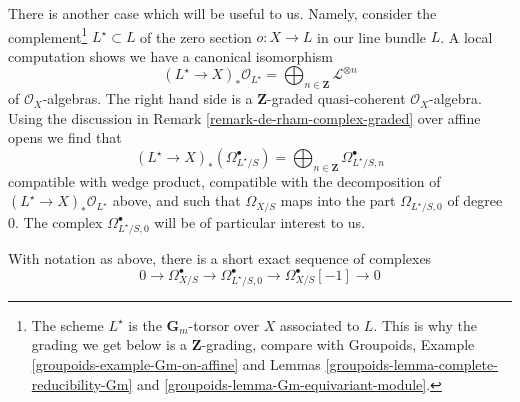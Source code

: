 \medskip\noindent
There is another case which will be useful to us. Namely, consider the
complement\footnote{The scheme $L^\star$ is the $\mathbf{G}_m$-torsor
over $X$ associated to $L$. This is why the grading we get below is
a $\mathbf{Z}$-grading, compare with Groupoids,
Example \ref{groupoids-example-Gm-on-affine} and
Lemmas \ref{groupoids-lemma-complete-reducibility-Gm} and
\ref{groupoids-lemma-Gm-equivariant-module}.}
$L^\star \subset L$ of the zero section $o : X \to L$ in our line
bundle $L$. A local computation shows we have a canonical isomorphism
$$
(L^\star \to X)_*\mathcal{O}_{L^\star} =
\bigoplus\nolimits_{n \in \mathbf{Z}} \mathcal{L}^{\otimes n}
$$
of $\mathcal{O}_X$-algebras. The right hand side is a $\mathbf{Z}$-graded
quasi-coherent $\mathcal{O}_X$-algebra. Using the discussion in
Remark \ref{remark-de-rham-complex-graded} over affine opens we find that
$$
(L^\star \to X)_*(\Omega^\bullet_{L^\star/S}) =
\bigoplus\nolimits_{n \in \mathbf{Z}} \Omega^\bullet_{L^\star/S, n}
$$
compatible with wedge product, compatible with the decomposition
of $(L^\star \to X)_*\mathcal{O}_{L^\star}$ above, and such that
$\Omega_{X/S}$ maps into the part $\Omega_{L^\star/S, 0}$ of degree $0$.
The complex $\Omega^\bullet_{L^\star/S, 0}$ will be
of particular interest to us.

\begin{lemma}
\label{lemma-the-complex-for-L-star}
With notation as above, there is a short exact sequence of complexes
$$
0 \to \Omega^\bullet_{X/S} \to
\Omega^\bullet_{L^\star/S, 0} \to
\Omega^\bullet_{X/S}[-1] \to 0
$$
\end{lemma}

